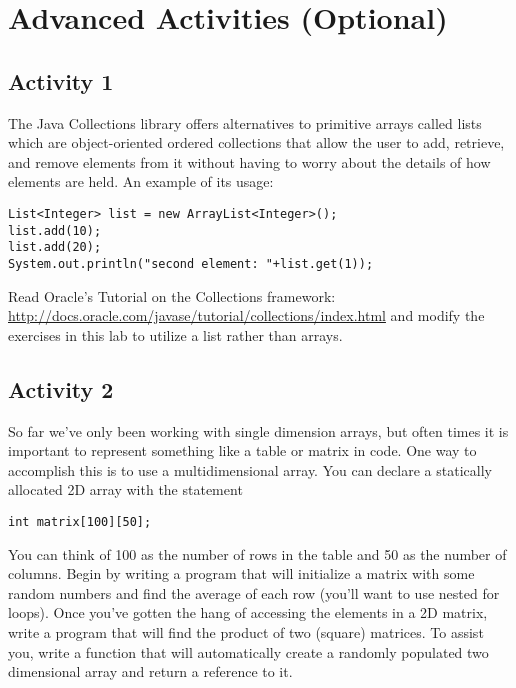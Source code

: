 \documentclass[12pt]{scrartcl}
\begin{document}
\section{Advanced Activities (Optional)}

\subsection{Activity 1}

The Java Collections library offers alternatives to primitive arrays called lists which 
are object-oriented ordered collections that allow the user to add, retrieve, and 
remove elements from it without having to worry about the details of how elements 
are held.  An example of its usage:

\begin{verbatim}
List<Integer> list = new ArrayList<Integer>();
list.add(10);
list.add(20);
System.out.println("second element: "+list.get(1));
\end{verbatim}

Read Oracle's Tutorial on the Collections framework: 
\url{http://docs.oracle.com/javase/tutorial/collections/index.html} and modify 
the exercises in this lab to utilize a list rather than arrays.

\subsection{Activity 2}
So far we've only been working with single dimension arrays, but often times it 
is important to represent something like a table or matrix in code.  One way to 
accomplish this is to use a multidimensional array.  You can declare a statically 
allocated 2D array with the statement 

\texttt{int matrix[100][50];}

You can think of 100 as the number of rows in the table and 50 as the number 
of columns.  Begin by writing a program that will initialize a matrix with some 
random numbers and find the average of each row (you'll want to use nested 
for loops).  Once you've gotten the hang of accessing the elements in a 2D
matrix, write a program that will find the product of two (square) matrices.  
To assist you, write a function that will automatically create a randomly populated 
two dimensional array and return a reference to it.
\end{document}
